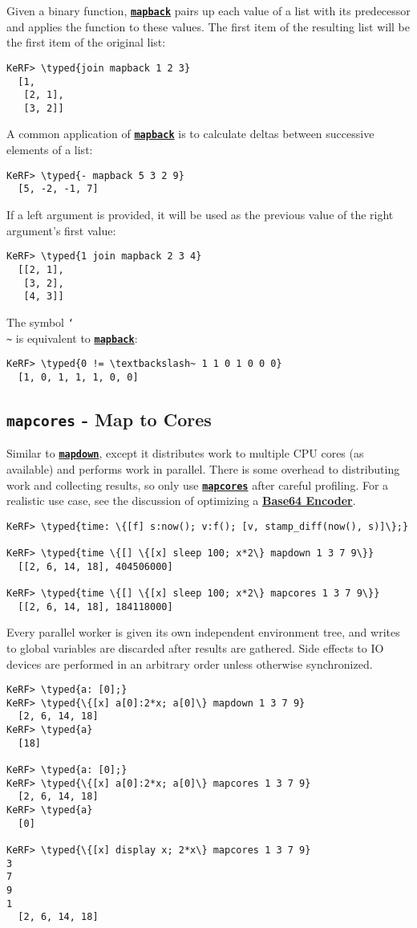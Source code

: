 \documentclass{article}
\newcommand{\typed}[1]{\textcolor{TealBlue}{#1}}
\newcommand{\primdefu}[3]{\subsection{\texttt{#1} - #2}\label{prim:#3}}
\newcommand{\primu}[2]{\hyperref[prim:#2]{\textbf{\texttt{#1}}}}
\newcommand{\combdef}[2]{\primdefu{#1}{#2}{#1}}
\newcommand{\comb}[1]{\primu{#1}{#1}}
\begin{document}
Given a binary function, \comb{mapback} pairs up each value of a list with its predecessor and applies the function to these values. The first item of the resulting list will be the first item of the original list:

\begin{Verbatim}
KeRF> \typed{join mapback 1 2 3}
  [1, 
   [2, 1], 
   [3, 2]]
\end{Verbatim}

A common application of \comb{mapback} is to calculate deltas between successive elements of a list:

\begin{Verbatim}
KeRF> \typed{- mapback 5 3 2 9}
  [5, -2, -1, 7]
\end{Verbatim}

If a left argument is provided, it will be used as the previous value of the right argument's first value:
\begin{Verbatim}
KeRF> \typed{1 join mapback 2 3 4}
  [[2, 1], 
   [3, 2], 
   [4, 3]]
\end{Verbatim}

The symbol \texttt{\char`\\\~} is equivalent to \comb{mapback}:
\begin{Verbatim}
KeRF> \typed{0 != \textbackslash~ 1 1 0 1 0 0 0}
  [1, 0, 1, 1, 1, 0, 0]
\end{Verbatim}

\combdef{mapcores}{Map to Cores}

Similar to \comb{mapdown}, except it distributes work to multiple CPU cores (as available) and performs work in parallel. There is some overhead to distributing work and collecting results, so only use \comb{mapcores} after careful profiling. For a realistic use case, see the discussion of optimizing a \hyperref[mapcoresBase64]{\textbf{Base64 Encoder}}.
\begin{Verbatim}
KeRF> \typed{time: \{[f] s:now(); v:f(); [v, stamp_diff(now(), s)]\};}

KeRF> \typed{time \{[] \{[x] sleep 100; x*2\} mapdown 1 3 7 9\}}
  [[2, 6, 14, 18], 404506000]

KeRF> \typed{time \{[] \{[x] sleep 100; x*2\} mapcores 1 3 7 9\}}
  [[2, 6, 14, 18], 184118000]
\end{Verbatim}

Every parallel worker is given its own independent environment tree, and writes to global variables are discarded after results are gathered. Side effects to IO devices are performed in an arbitrary order unless otherwise synchronized.
\begin{Verbatim}
KeRF> \typed{a: [0];}
KeRF> \typed{\{[x] a[0]:2*x; a[0]\} mapdown 1 3 7 9}
  [2, 6, 14, 18]
KeRF> \typed{a}
  [18]

KeRF> \typed{a: [0];}
KeRF> \typed{\{[x] a[0]:2*x; a[0]\} mapcores 1 3 7 9}
  [2, 6, 14, 18]
KeRF> \typed{a}
  [0]

KeRF> \typed{\{[x] display x; 2*x\} mapcores 1 3 7 9}
3
7
9
1
  [2, 6, 14, 18]
\end{Verbatim}
\end{document}
